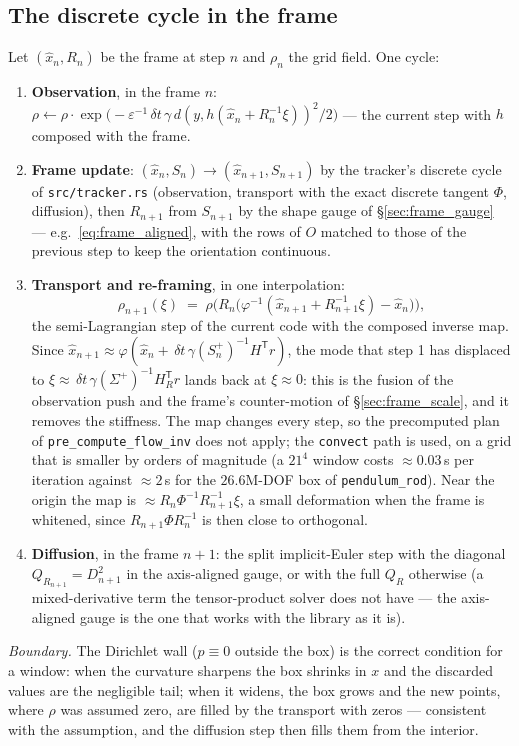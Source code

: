 \documentclass[11pt,a4paper]{article}
\newcommand{\T}{^{\mathsf T}}
\newcommand{\xh}{\hat{x}}
\newcommand{\eps}{\varepsilon}
\newcommand{\dt}{\,\delta t}
\theoremstyle{plain}
\theoremstyle{definition}
\theoremstyle{remark}
\begin{document}
\subsection{The discrete cycle in the frame}
\label{sec:frame_cycle}

Let $(\xh_n,R_n)$ be the frame at step $n$ and $\rho_n$ the grid field. One cycle:
\begin{enumerate}[leftmargin=1.5em,nosep]
  \item \textbf{Observation}, in the frame $n$: $\rho\leftarrow\rho\cdot\exp\big(-\eps^{-1}\dt\,\gamma\,d(y,h(\xh_n+R_n^{-1}\xi))^2/2\big)$ --- the current step with $h$ composed with the frame.
  \item \textbf{Frame update}: $(\xh_n,S_n)\to(\xh_{n+1},S_{n+1})$ by the tracker's discrete cycle of \texttt{src/tracker.rs} (observation, transport with the exact discrete tangent $\Phi$, diffusion), then $R_{n+1}$ from $S_{n+1}$ by the shape gauge of \S\ref{sec:frame_gauge} --- e.g.\ \eqref{eq:frame_aligned}, with the rows of $O$ matched to those of the previous step to keep the orientation continuous.
  \item \textbf{Transport and re-framing}, in one interpolation:
  \begin{equation}
    \rho_{n+1}(\xi) \;=\; \rho\Big(R_n\big(\varphi^{-1}(\xh_{n+1}+R_{n+1}^{-1}\xi) - \xh_n\big)\Big),
    \label{eq:frame_transport}
  \end{equation}
  the semi-Lagrangian step of the current code with the composed inverse map. Since $\xh_{n+1}\approx\varphi(\xh_n + \dt\,\gamma(S_n^+)^{-1}H\T r)$, the mode that step 1 has displaced to $\xi\approx\dt\,\gamma(\Sigma^+)^{-1}H_R\T r$ lands back at $\xi\approx0$: this is the fusion of the observation push and the frame's counter-motion of \S\ref{sec:frame_scale}, and it removes the stiffness. The map changes every step, so the precomputed plan of \texttt{pre\_compute\_flow\_inv} does not apply; the \texttt{convect} path is used, on a grid that is smaller by orders of magnitude (a $21^4$ window costs $\approx0.03$\,s per iteration against $\approx2$\,s for the $26.6$M-DOF box of \texttt{pendulum\_rod}). Near the origin the map is $\approx R_n\Phi^{-1}R_{n+1}^{-1}\xi$, a small deformation when the frame is whitened, since $R_{n+1}\Phi R_n^{-1}$ is then close to orthogonal.
  \item \textbf{Diffusion}, in the frame $n+1$: the split implicit-Euler step with the diagonal $Q_{R_{n+1}} = D_{n+1}^2$ in the axis-aligned gauge, or with the full $Q_R$ otherwise (a mixed-derivative term the tensor-product solver does not have --- the axis-aligned gauge is the one that works with the library as it is).
\end{enumerate}
\emph{Boundary.} The Dirichlet wall ($p\equiv0$ outside the box) is the correct condition for a window: when the curvature sharpens the box shrinks in $x$ and the discarded values are the negligible tail; when it widens, the box grows and the new points, where $\rho$ was assumed zero, are filled by the transport with zeros --- consistent with the assumption, and the diffusion step then fills them from the interior.
\end{document}
